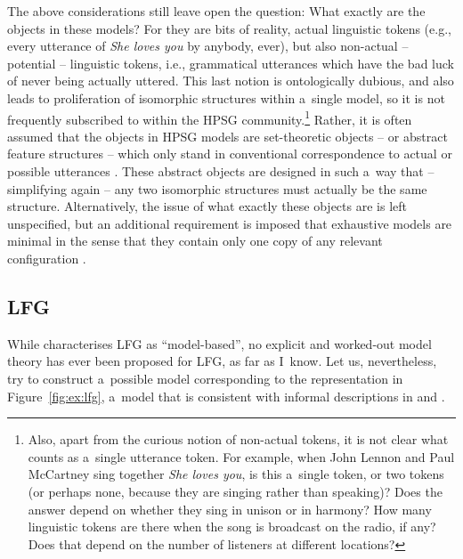 \documentclass[output=paper,hidelinks]{langscibook}
\begin{document}
The above considerations still leave open the question: What exactly are the objects in these models?  For \citet{king:99} they are bits of reality, actual linguistic tokens (e.g., every utterance of \emph{She loves you} by anybody, ever), but also non-actual -- potential -- linguistic tokens, i.e., grammatical utterances which have the bad luck of never being actually uttered.  This last notion is ontologically dubious, and also leads to proliferation of isomorphic structures within a~single model, so it is not frequently subscribed to within the HPSG community.\footnote{Also, apart from the curious notion of non-actual tokens, it is not clear what counts as a~single utterance token.  For example, when John Lennon and Paul McCartney sing together \emph{She loves you}, is this a~single token, or two tokens (or perhaps none, because they are singing rather than speaking)?  Does the answer depend on whether they sing in unison or in harmony?  How many linguistic tokens are there when the song is broadcast on the radio, if any?  Does that depend on the number of listeners at different locations?}  Rather, it is often assumed that the objects in HPSG models are set-theoretic objects -- or abstract feature structures -- which only stand in conventional correspondence to actual or possible utterances \citep{pollard1994head-driven,poll:98}.  These abstract objects are designed in such a~way that -- simplifying again -- any two isomorphic structures must actually be the same structure.  Alternatively, the issue of what exactly these objects are is left unspecified, but an additional requirement is imposed that exhaustive models are minimal in the sense that they contain only one copy of any relevant configuration \citep{rich:07:hpsg}.

\subsection{LFG}
\label{sec:mod:lfg}
\largerpage
While \citet[11]{kaplan1995formal} characterises LFG as “model-based”, no explicit and wor\-ked-out model theory has ever been proposed for LFG, as far as I~know.  Let us, nevertheless, try to construct a~possible model corresponding to the representation in Figure~\ref{fig:ex:lfg}, a~model that is consistent with informal descriptions in \citet{kaplanbresnan82} and \citet{kaplan1995formal}.
\end{document}
